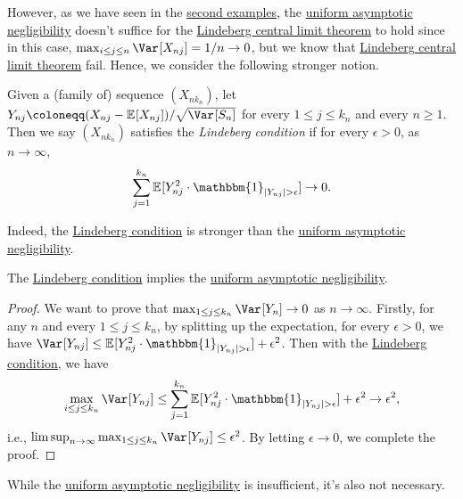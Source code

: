 However, as we have seen in the \hyperref[eg:Poisson-CLT-fail]{second examples}, the \hyperref[def:uniform-asymptotic-negligibility]{uniform asymptotic negligibility} doesn't suffice for the \hyperref[thm:Lindeberg-CLT]{Lindeberg central limit theorem} to hold since in this case, \(\max _{i \leq j \leq n} \Var_{}[X_{nj}] = 1 / n \to 0\), but we know that \hyperref[thm:Lindeberg-CLT]{Lindeberg central limit theorem} fail. Hence, we consider the following stronger notion.

\begin{definition}\label{def:Lindeberg-condition}
	Given a (family of) sequence \((X_{n k_n})\), let \(Y_{nj} \coloneqq (X_{nj} - \mathbb{E}_{}[X_{nj}] ) / \sqrt{\Var_{}[S_n] }\) for every \(1 \leq j \leq k_n\) and every \(n \geq 1\). Then we say \((X_{n k_n})\) satisfies the \emph{Lindeberg condition} if for every \(\epsilon > 0\), as \(n \to \infty \),
	\[
		\sum_{j=1}^{k_n} \mathbb{E}_{}[Y_{nj}^2 \cdot \mathbbm{1}_{\vert Y_{nj} \vert > \epsilon } ] \to 0.
	\]
\end{definition}

Indeed, the \hyperref[def:Lindeberg-condition]{Lindeberg condition} is stronger than the \hyperref[def:uniform-asymptotic-negligibility]{uniform asymptotic negligibility}.

\begin{proposition}\label{prop:Lindeberg-condition-implies-UAN}
	The \hyperref[def:Lindeberg-condition]{Lindeberg condition} implies the \hyperref[def:uniform-asymptotic-negligibility]{uniform asymptotic negligibility}.
\end{proposition}
\begin{proof}
	We want to prove that \(\max _{1 \leq j \leq k_n} \Var_{}[Y_n] \to 0\) as \(n \to \infty \). Firstly, for any \(n\) and every \(1 \leq j \leq k_n\), by splitting up the expectation, for every \(\epsilon > 0\), we have \(\Var_{}[Y_{nj}] \leq \mathbb{E}_{}[Y_{nj}^2 \cdot \mathbbm{1}_{\vert Y_{nj} \vert > \epsilon } ] + \epsilon ^2\). Then with the \hyperref[def:Lindeberg-condition]{Lindeberg condition}, we have
	\[
		\max _{i \leq j \leq k_n} \Var_{}[Y_{nj}]
		\leq \sum_{j=1}^{k_n} \mathbb{E}_{}[Y_{nj}^2 \cdot \mathbbm{1}_{\vert Y_{nj} \vert > \epsilon } ] + \epsilon ^2
		\to \epsilon ^2,
	\]
	i.e., \(\limsup_{n \to \infty} \max _{1 \leq j \leq k_n} \Var_{}[Y_{nj}]  \leq \epsilon ^2\). By letting \(\epsilon \to 0\), we complete the proof.
\end{proof}

While the \hyperref[def:uniform-asymptotic-negligibility]{uniform asymptotic negligibility} is insufficient, it's also not necessary.

